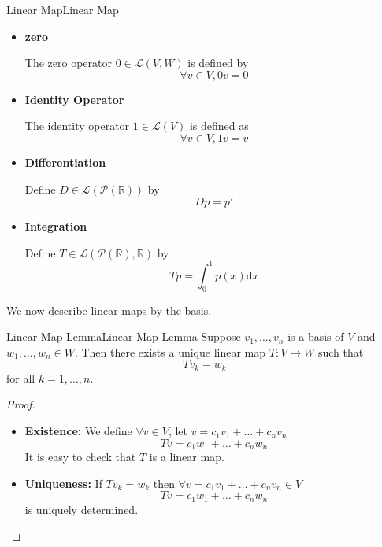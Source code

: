 \documentclass[../main.tex]{subfiles}
\begin{document}
\begin{example}{Linear Map}{Linear Map}
\begin{itemize}
\item \textbf{zero}

	The zero operator $0\in \mathscr{L}(V,W)$ is defined by
	\begin{equation*}
	\forall v\in V,0v=0
	\end{equation*}
\item \textbf{Identity Operator}

	The identity operator $1\in \mathscr{L}(V)$ is defined as
	\begin{equation*}
	\forall v\in V, 1v=v
	\end{equation*}
\item \textbf{Differentiation}

	Define $D \in \mathscr{L}(\mathscr{P}(\mathbb{R}))$ by
	\begin{equation*}
	Dp=p'
	\end{equation*}
\item \textbf{Integration}

	Define $T \in \mathscr{L}(\mathscr{P}(\mathbb{R}),\mathbb{R})$ by
	\begin{equation*}
	Tp=\int_0^1 p(x) \mathrm{d}x
	\end{equation*}
\end{itemize}
\end{example}

We now describe linear maps by the basis.
\begin{lemma}{Linear Map Lemma}{Linear Map Lemma}
Suppose $v_1, \ldots ,v_n$ is a basis of $V$ and $w_1, \ldots ,w_n \in W$. Then there exists a unique linear map $T:V \rightarrow W$ such that
\begin{equation*}
Tv_k=w_k
\end{equation*}
for all $k=1, \ldots ,n$.
\end{lemma}
\begin{proof}
\begin{itemize}
\item \textbf{Existence: } We define $\forall v\in V$, let $v=c_1v_1+\ldots +c_nv_n$ 
	\begin{equation}
	Tv = c_1w_1+\ldots +c_nw_n
	\end{equation}
	It is easy to check that $T$ is a linear map.
\item \textbf{Uniqueness: } If $Tv_k=w_k$ then $\forall v=c_1v_1+\ldots +c_nv_n\in V$ 
	\begin{equation*}
	Tv=c_1w_1+\ldots +c_nw_n
	\end{equation*}
	is uniquely determined.
\end{itemize}
\end{proof}
\end{document}
